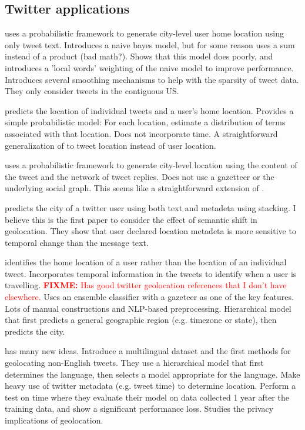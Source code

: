 \documentclass[sigconf,10pt]{acmart}
\newcommand{\fixme}[1]{\textcolor{red}{\textbf{FIXME:} {#1}}}
\begin{document}
\subsection{Twitter applications}

\citet{cheng2010you} uses a probabilistic framework to generate city-level user home location using only tweet text.
Introduces a naive bayes model, but for some reason uses a sum instead of a product (bad math?).
Shows that this model does poorly,
and introduces a 'local words' weighting of the naive model to improve performance.
Introduces several smoothing mechanisms to help with the sparsity of tweet data.
They only consider tweets in the contiguous US.

\citet{kinsella2011m} predicts the location of individual tweets and a user's home location.
Provides a simple probabilistic model: 
For each location, estimate a distribution of terms associated with that location.
Does not incorporate time.
A straightforward generalization of \citet{cheng2010you} to tweet location instead of user location.

\citet{li2012towards} uses a probabilistic framework to generate city-level location using the content of the tweet and the network of tweet replies.
Does not use a gazetteer or the underlying social graph.
This seems like a straightforward extension of \citet{cheng2010you}.

\citet{han2013stacking} predicts the city of a twitter user using both text and metadeta using stacking.
I believe this is the first paper to consider the effect of semantic shift in geolocation.
They show that user declared location metadeta is more sensitive to temporal change than the message text.

\citet{mahmud2014home} identifies the home location of a user rather than the location of an individual tweet.
Incorporates temporal information in the tweets to identify when a user is travelling.
\fixme{Has good twitter geolocation references that I don't have elsewhere.}
Uses an ensemble classifier with a gazeteer as one of the key features.
Lots of manual constructions and NLP-based preprocessing.
Hierarchical model that first predicts a general geographic region (e.g. timezone or state), then predicts the city.

\citet{han2014text} has many new ideas.
Introduce a multilingual dataset and the first methods for geolocating non-English tweets.
They use a hierarchical model that first determines the language,
then selects a model appropriate for the language.
Make heavy use of twitter metadata (e.g. tweet time) to determine location.
Perform a test on time where they evaluate their model on data collected 1 year after the training data, and show a significant performance loss.
Studies the privacy implications of geolocation.
\end{document}
